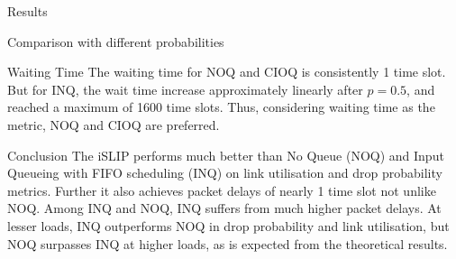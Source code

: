 \begin{section}{Results}
\begin{subsection}{Comparison with different probabilities}
    \begin{subsubsection}{Waiting Time}
    The waiting time for NOQ and CIOQ is consistently 1 time slot. But for INQ, the wait time increase approximately linearly after $p=0.5$, and reached a maximum of 1600 time slots. Thus, considering waiting time as the metric, NOQ and CIOQ are preferred.
    \end{subsubsection}

\end{subsection}

\begin{subsection}

\end{subsection}
    

\end{section}

\begin{section}{Conclusion}
    The iSLIP performs much better than No Queue (NOQ) and Input Queueing with FIFO scheduling (INQ) on link utilisation and drop probability metrics. Further it also achieves packet delays of nearly 1 time slot not unlike NOQ. Among INQ and NOQ, INQ suffers from much higher packet delays. At lesser loads, INQ outperforms NOQ in drop probability and link utilisation, but NOQ surpasses INQ at higher loads, as is expected from the theoretical results.  
\end{section}
